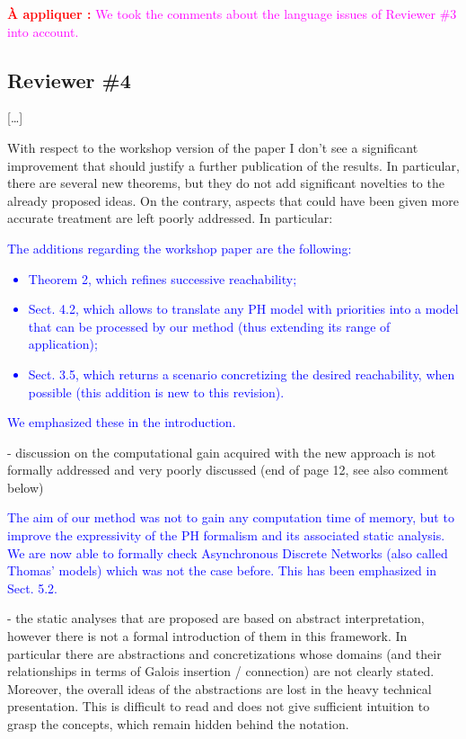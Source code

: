 \documentclass[11pt]{article}
\newcommand{\answertodo}[1]{\textcolor{red}{\textbf{À appliquer :}} \textcolor{magenta}{#1}}
\newcommand{\answer}[1]{\textcolor{blue}{#1}}
\begin{document}
\answertodo{
We took the comments about the language issues of Reviewer \#3 into account.
}



\subsection*{Reviewer \#4}

[…]

With respect to the workshop version of the paper I don't see a significant improvement that should justify a further publication of the results. In particular, there are several new theorems, but they do not add significant novelties to the already proposed ideas. On the contrary, aspects that could have been given more accurate treatment are left poorly addressed. In particular:

\answer{
The additions regarding the workshop paper are the following:
\begin{itemize}
  \item Theorem 2, which refines successive reachability;
  \item Sect. 4.2, which allows to translate any PH model with priorities
    into a model that can be processed by our method (thus extending its range of application);
  \item Sect. 3.5, which returns a scenario concretizing the desired reachability,
    when possible (this addition is new to this revision).
\end{itemize}
We emphasized these in the introduction.
}

- discussion on the computational gain acquired with the new approach is not formally addressed and very poorly discussed (end of page 12, see also comment below)

\answer{
The aim of our method was not to gain any computation time of memory,
but to improve the expressivity of the PH formalism and its associated static analysis.
We are now able to formally check Asynchronous Discrete Networks
(also called Thomas' models)
which was not the case before.
This has been emphasized in Sect. 5.2.
}

- the static analyses that are proposed are based on abstract interpretation, however there is not a formal introduction of them in this framework. In particular there are abstractions and concretizations whose domains (and their relationships in terms of Galois insertion / connection) are not clearly stated. Moreover, the overall ideas of the abstractions are lost in the heavy technical presentation. This is difficult to read and does not give sufficient intuition to grasp the concepts, which remain hidden behind the notation. 
\end{document}
